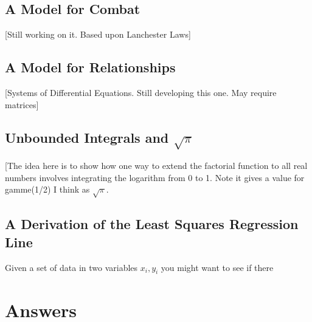 \documentclass{amsbook}
\begin{document}
\newpage	    
    \section*{A Model for Combat}
	[Still working on it. Based upon Lanchester Laws]
\newpage	    
    \section*{A Model for Relationships}
	[Systems of Differential Equations. Still developing this one. May require matrices]
	\newpage
	
	\section*{Unbounded Integrals and $\sqrt{\pi}$}
	[The idea here is to show how one way to extend the factorial function to all real numbers involves integrating the logarithm from 0 to 1. Note it gives a value for gamme(1/2) I think as $\sqrt{\pi}$. 
	
	\newpage	    
	
	\section*{A Derivation of the Least Squares Regression Line}
		
		Given a set of data in two variables ${x_i,y_i}$ you might want to see if there 


\chapter{Answers}
\shipoutAnswer

\printbibliography
\end{document}
